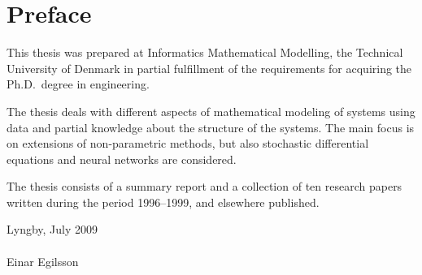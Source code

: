 \chapter{Preface}

This thesis was prepared at Informatics Mathematical Modelling,
the Technical University of Denmark in partial fulfillment of the
requirements for acquiring the Ph.D.\ degree in engineering.

The thesis deals with different aspects of mathematical modeling of
systems using data and partial knowledge about the structure of the
systems.  The main focus is on extensions of non-parametric methods,
but also stochastic differential equations and neural networks are
considered.

The thesis consists of a summary report and a collection of ten
research papers written during the period 1996--1999, and elsewhere
published.

\vspace{20mm}
\mbox{}\hfill
\begin{minipage}[t]{80mm}
  Lyngby, July 2009
  \\ \\
  Einar Egilsson
\end{minipage}
